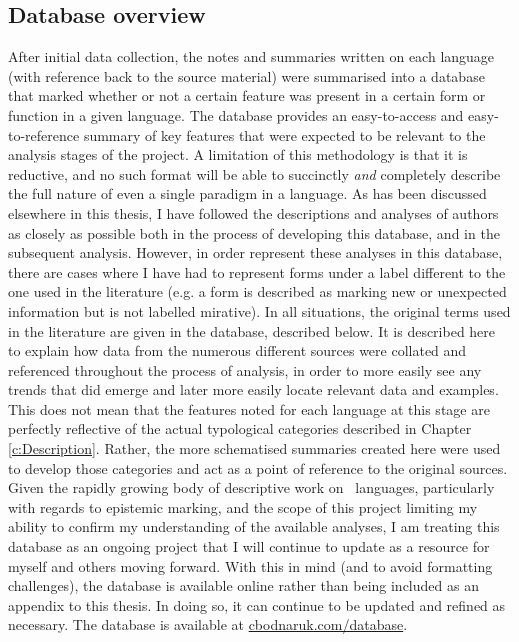 \subsection{Database overview}
After initial data collection, the notes and summaries written on each language (with reference back to the source material) were summarised into a database that marked whether or not a certain feature was present in a certain form or function in a given language. The database provides an easy-to-access and easy-to-reference summary of key features that were expected to be relevant to the analysis stages of the project. A limitation of this methodology is that it is reductive, and no such format will be able to succinctly \textit{and} completely describe the full nature of even a single paradigm in a language. As has been discussed elsewhere in this thesis, I have followed the descriptions and analyses of authors as closely as possible both in the process of developing this database, and in the subsequent analysis. However, in order represent these analyses in this database, there are cases where I have had to represent forms under a label different to the one used in the literature (e.g. a form is described as marking new or unexpected information but is not labelled mirative). In all situations, the original terms used in the literature are given in the database, described below. It is described here to explain how data from the numerous different sources were collated and referenced throughout the process of analysis, in order to more easily see any trends that did emerge and later more easily locate relevant data and examples. This does not mean that the features noted for each language at this stage are perfectly reflective of the actual typological categories described in Chapter \ref{c:Description}. Rather, the more schematised summaries created here were used to develop those categories and act as a point of reference to the original sources. Given the rapidly growing body of descriptive work on \lfam\ languages, particularly with regards to epistemic marking, and the scope of this project limiting my ability to confirm my understanding of the available analyses, I am treating this database as an ongoing project that I will continue to update as a resource for myself and others moving forward. With this in mind (and to avoid formatting challenges), the database is available online rather than being included as an appendix to this thesis. In doing so, it can continue to be updated and refined as necessary. The database is available at \url{cbodnaruk.com/database}.

